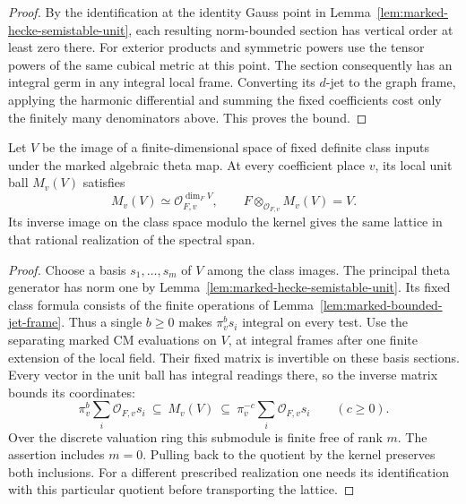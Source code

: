 \begin{proof}
By the identification at the identity Gauss point in
Lemma~\ref{lem:marked-hecke-semistable-unit}, each resulting
norm-bounded section has vertical order at least zero there.
For exterior products and symmetric powers use the tensor powers
of the same cubical metric at this point. The section consequently
has an integral germ in any integral local frame.
Converting its \(d\)-jet to the graph frame, applying the harmonic
differential and summing the fixed coefficients cost only the
finitely many denominators above. This proves the bound.
\end{proof}

\begin{auxlemma}
\label{cor:marked-full-class-ball}
Let \(V\) be the image of a finite-dimensional space of fixed
definite class inputs under the marked algebraic theta map. At
every coefficient place \(v\), its local unit ball \(M_v(V)\)
satisfies
\[
      M_v(V)\simeq\mathcal O_{F,v}^{\dim_F V},\qquad
                  F\otimes_{\mathcal O_{F,v}}M_v(V)=V .
\]
Its inverse
image on the class space modulo the kernel gives the same lattice
in that rational realization of the spectral span.
\end{auxlemma}
\begin{proof}
Choose a basis \(s_1,\ldots,s_m\) of \(V\) among the class images.
The principal theta generator has norm one by
Lemma~\ref{lem:marked-hecke-semistable-unit}. Its fixed class
formula consists of the finite operations of
Lemma~\ref{lem:marked-bounded-jet-frame}. Thus a single \(b\ge0\)
makes \(\pi_v^b s_i\) integral on every test. Use the separating
marked CM evaluations on \(V\), at integral frames after one finite
extension of the local field. Their fixed matrix is invertible on
these basis sections. Every vector in the unit ball has integral
readings there, so the inverse matrix bounds its coordinates:
\[
  \pi_v^b\sum_i\mathcal O_{F,v}s_i\ \subseteq\ M_v(V)
       \ \subseteq\ \pi_v^{-c}\sum_i\mathcal O_{F,v}s_i
                         \qquad(c\ge0).
\]
Over the discrete valuation ring this submodule is finite free of
rank \(m\). The assertion includes \(m=0\). Pulling back to the
quotient by the kernel preserves both inclusions. For a different
prescribed realization one needs its identification with this
particular quotient before transporting the lattice.
\end{proof}

